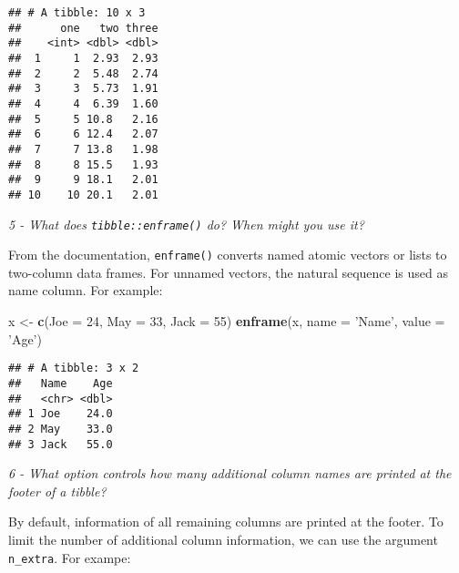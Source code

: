 \documentclass[]{article}
\newenvironment{Shaded}{\begin{snugshade}}{\end{snugshade}}
\newcommand{\KeywordTok}[1]{\textcolor[rgb]{0.13,0.29,0.53}{\textbf{#1}}}
\newcommand{\DataTypeTok}[1]{\textcolor[rgb]{0.13,0.29,0.53}{#1}}
\newcommand{\DecValTok}[1]{\textcolor[rgb]{0.00,0.00,0.81}{#1}}
\newcommand{\StringTok}[1]{\textcolor[rgb]{0.31,0.60,0.02}{#1}}
\newcommand{\OperatorTok}[1]{\textcolor[rgb]{0.81,0.36,0.00}{\textbf{#1}}}
\newcommand{\NormalTok}[1]{#1}
\theoremstyle{definition}
\theoremstyle{definition}
\theoremstyle{definition}
\theoremstyle{remark}
\begin{document}
\begin{Shaded}
\end{Shaded}

\begin{verbatim}
## # A tibble: 10 x 3
##      one   two three
##    <int> <dbl> <dbl>
##  1     1  2.93  2.93
##  2     2  5.48  2.74
##  3     3  5.73  1.91
##  4     4  6.39  1.60
##  5     5 10.8   2.16
##  6     6 12.4   2.07
##  7     7 13.8   1.98
##  8     8 15.5   1.93
##  9     9 18.1   2.01
## 10    10 20.1   2.01
\end{verbatim}

\emph{5 - What does \texttt{tibble::enframe()} do? When might you use
it?}

From the documentation, \texttt{enframe()} converts named atomic vectors
or lists to two-column data frames. For unnamed vectors, the natural
sequence is used as name column. For example:

\begin{Shaded}
\begin{Highlighting}[]
\NormalTok{x <-}\StringTok{ }\KeywordTok{c}\NormalTok{(}\DataTypeTok{Joe =} \DecValTok{24}\NormalTok{, }\DataTypeTok{May =} \DecValTok{33}\NormalTok{, }\DataTypeTok{Jack =} \DecValTok{55}\NormalTok{)}
\KeywordTok{enframe}\NormalTok{(x, }\DataTypeTok{name =} \StringTok{'Name'}\NormalTok{, }\DataTypeTok{value =} \StringTok{'Age'}\NormalTok{)}
\end{Highlighting}
\end{Shaded}

\begin{verbatim}
## # A tibble: 3 x 2
##   Name    Age
##   <chr> <dbl>
## 1 Joe    24.0
## 2 May    33.0
## 3 Jack   55.0
\end{verbatim}

\emph{6 - What option controls how many additional column names are
printed at the footer of a tibble?}

By default, information of all remaining columns are printed at the
footer. To limit the number of additional column information, we can use
the argument \texttt{n\_extra}. For exampe:
\end{document}
